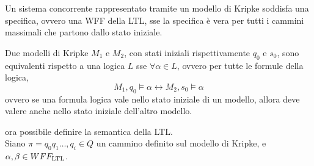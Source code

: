 Un sistema concorrente rappresentato tramite un modello di Kripke soddisfa una
specifica, ovvero una WFF della LTL, sse la specifica è vera per tutti i
cammini massimali che partono dallo stato iniziale.

Due modelli di Kripke $M_1$ e $M_2$, con stati iniziali rispettivamente
$q_0$ e $s_0$, sono equivalenti rispetto a una logica $L$ sse $\forall \alpha \in L$,
ovvero per tutte le formule della logica,
\[
    M_1, q_0 \vDash \alpha \longleftrightarrow M_2, s_0 \vDash \alpha
\]
ovvero se una formula logica vale nello stato iniziale di un modello, allora
deve valere anche nello stato iniziale dell'altro modello.

\upperAccE ora possibile definire la semantica della LTL.\\

Siano $\pi = q_0 q_1 \ldots, q_i \in Q$ un cammino definito sul modello di
Kripke, e $\alpha, \beta \in WFF_{\textnormal{LTL}}$.
